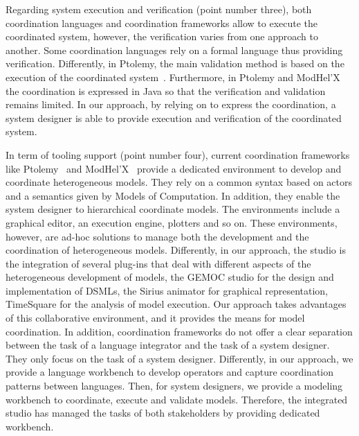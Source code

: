 Regarding system execution and verification (point number three), both coordination languages and coordination frameworks allow to execute the coordinated system, however, the verification varies from one approach to another. Some coordination languages rely on a formal language thus providing verification. Differently, in Ptolemy, the main validation method is based on the execution of the coordinated system~\cite{ptoleframebib}. Furthermore, in Ptolemy and ModHel'X the coordination is expressed in Java so that the verification and validation remains limited. In our approach, by relying on \ccsl to express the coordination, a system designer is able to provide execution and verification of the coordinated system.

In term of tooling support (point number four), current coordination frameworks like Ptolemy~\cite{ptoleframebib} and ModHel'X~\cite{modhelxbib} provide a dedicated environment to develop and coordinate heterogeneous models. They rely on a common syntax based on actors and a semantics given by Models of Computation. In addition, they enable the system designer to hierarchical coordinate models. The environments include a graphical editor, an execution engine, plotters and so on. These environments, however, are ad-hoc solutions to manage both the development and the coordination of heterogeneous models. Differently, in our approach, the studio is the integration of several plug-ins that deal with different aspects of the heterogeneous development of models, \eg the GEMOC studio for the design and implementation of DSMLs, the Sirius animator for graphical representation, TimeSquare for the analysis of model execution. Our approach takes advantages of this collaborative environment, and it provides the means for model coordination. In addition, coordination frameworks do not offer a clear separation between the task of a language integrator and the task of a system designer. They only focus on the task of a system designer. Differently, in our approach, we provide a language workbench to develop \bcool operators and capture coordination patterns between languages. Then, for system designers, we provide a modeling workbench to coordinate, execute and validate models. Therefore, the integrated studio has managed the tasks of both stakeholders by providing dedicated workbench. 
